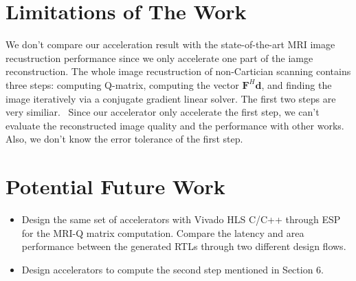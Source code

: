 \documentclass{sig-alternate}
\begin{document}
\section{Limitations of The Work}

We don't compare our acceleration result with the state-of-the-art MRI image recustruction performance since we only accelerate one part of the iamge reconstruction. The whole image recustruction of non-Cartician scanning contains three steps: computing Q-matrix, computing the vector $\mathbf{F}^{H} \mathbf{d}$, and finding the image iteratively via a conjugate gradient linear solver. The first two steps are very similiar.~\cite{stone2008accelerating} Since our accelerator only accelerate the first step, we can't evaluate the reconstructed image quality and the performance with other works. Also, we don't know the error tolerance of the first step. 


\section{Potential Future Work}
\begin{itemize}
    \item Design the same set of accelerators with Vivado HLS C/C++ through ESP for the MRI-Q matrix computation. Compare the latency and area performance between the generated RTLs through two different design flows.
    \item Design accelerators to compute the second step mentioned in Section 6. 
\end{itemize}



{\small
\balance
%


}





\end{document}
